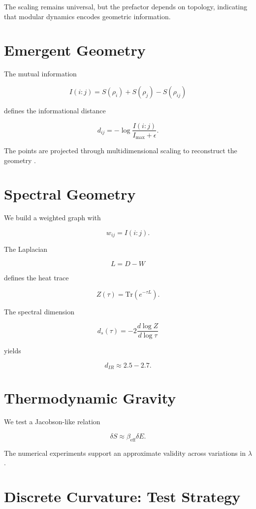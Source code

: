 \documentclass[11pt]{article}
\begin{document}
The scaling remains universal, but the prefactor depends on topology, indicating that modular dynamics encodes geometric information.


\section{Emergent Geometry}

The mutual information

\[
I(i:j)=S(\rho_i)+S(\rho_j)-S(\rho_{ij})
\]

defines the informational distance

\[
d_{ij}=-\log\frac{I(i:j)}{I_{\max}+\epsilon}.
\]

The points are projected through multidimensional scaling to reconstruct the geometry \cite{vanraamsdonk}.

\section{Spectral Geometry}

We build a weighted graph with

\[
w_{ij}=I(i:j).
\]

The Laplacian

\[
L=D-W
\]

defines the heat trace

\[
Z(\tau)=\mathrm{Tr}(e^{-\tau L}).
\]

The spectral dimension

\[
d_s(\tau)=-2\frac{d\log Z}{d\log\tau}
\]

yields

\[
d_{IR}\approx 2.5-2.7.
\]

\section{Thermodynamic Gravity}

We test a Jacobson-like relation \cite{jacobson}

\[
\delta S\approx \beta_{\mathrm{eff}}\delta E.
\]

The numerical experiments support an approximate validity across variations in $\lambda$.

\section{Discrete Curvature: Test Strategy}
\end{document}
